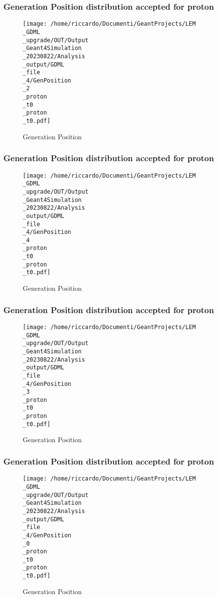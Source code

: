 \documentclass[8pt]{beamer}
\begin{document}
            \begin{frame}
                \frametitle{Generation Position distribution accepted for proton}
            
        \begin{figure}[h]
            \centering
            \texttt{[image: /home/riccardo/Documenti/GeantProjects/LEM\\\_GDML\\\_upgrade/OUT/Output\\\_Geant4Simulation\\\_20230822/Analysis\\\_output/GDML\\\_file\\\_4/GenPosition\\\_2\\\_proton\\\_t0\\\_proton\\\_t0.pdf]}
            \caption{Generation Position}
        \end{figure}
        
            \end{frame}
            
            \begin{frame}
                \frametitle{Generation Position distribution accepted for proton}
            
        \begin{figure}[h]
            \centering
            \texttt{[image: /home/riccardo/Documenti/GeantProjects/LEM\\\_GDML\\\_upgrade/OUT/Output\\\_Geant4Simulation\\\_20230822/Analysis\\\_output/GDML\\\_file\\\_4/GenPosition\\\_4\\\_proton\\\_t0\\\_proton\\\_t0.pdf]}
            \caption{Generation Position}
        \end{figure}
        
            \end{frame}
            
            \begin{frame}
                \frametitle{Generation Position distribution accepted for proton}
            
        \begin{figure}[h]
            \centering
            \texttt{[image: /home/riccardo/Documenti/GeantProjects/LEM\\\_GDML\\\_upgrade/OUT/Output\\\_Geant4Simulation\\\_20230822/Analysis\\\_output/GDML\\\_file\\\_4/GenPosition\\\_3\\\_proton\\\_t0\\\_proton\\\_t0.pdf]}
            \caption{Generation Position}
        \end{figure}
        
            \end{frame}
            
            \begin{frame}
                \frametitle{Generation Position distribution accepted for proton}
            
        \begin{figure}[h]
            \centering
            \texttt{[image: /home/riccardo/Documenti/GeantProjects/LEM\\\_GDML\\\_upgrade/OUT/Output\\\_Geant4Simulation\\\_20230822/Analysis\\\_output/GDML\\\_file\\\_4/GenPosition\\\_0\\\_proton\\\_t0\\\_proton\\\_t0.pdf]}
            \caption{Generation Position}
        \end{figure}
        
            \end{frame}
            
\end{document}
